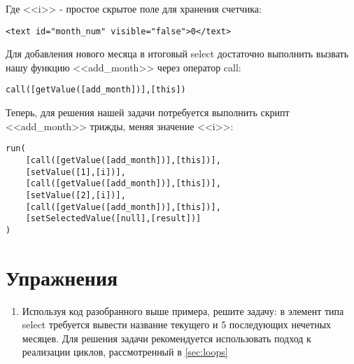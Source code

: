 \documentclass[../index.tex]{subfiles}
\begin{document}
Где <<i>> - простое скрытое поле для хранения счетчика:
\begin{verbatim}
<text id="month_num" visible="false">0</text>
\end{verbatim}

Для добавления нового месяца в итоговый select достаточно выполнить вызвать нашу функцию <<add\_month>> через оператор call: 

\begin{verbatim}
call([getValue([add_month])],[this])
\end{verbatim}

Теперь, для решения нашей задачи потребуется выполнить скрипт <<add\_month>> трижды, меняя значение <<i>>:

\begin{verbatim}
run(
    [call([getValue([add_month])],[this])],
    [setValue([1],[i])],
    [call([getValue([add_month])],[this])],
    [setValue([2],[i])],
    [call([getValue([add_month])],[this])],
    [setSelectedValue([null],[result])]
)
\end{verbatim}
\section{Упражнения}
    \begin{enumerate}
        \item Используя код разобранного выше примера, решите задачу: в элемент типа select требуется вывести название текущего и 5 последующих нечетных месяцев. Для решения задачи рекомендуется использовать подход к реализации циклов, рассмотренный в  \autoref{sec:loops}            
    \end{enumerate}
\end{document}
